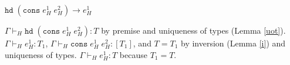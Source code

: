 \begin{case}
$\mathtt{hd}\;(\mathtt{cons}\;e_{H}^{1}\;e_{H}^{2})\rightarrow e_{H}^{1}$

$\Gamma\vdash_{H}\mathtt{hd}\;(\mathtt{cons}\;e_{H}^{1}\;e_{H}^{2}):T$ by premise and uniqueness of types (Lemma \ref{uot}).  $\Gamma\vdash_{H}e_{H}^{1}:T_{1}$, $\Gamma\vdash_{H}\mathtt{cons}\;e_{H}^{1}\;e_{H}^{2}:[T_{1}]$, and $T=T_{1}$ by inversion (Lemma \ref{i}) and uniqueness of types.  $\Gamma\vdash_{H}e_{H}^{1}:T$ because $T_{1}=T$.
\end{case}